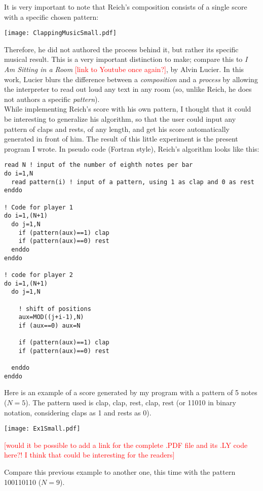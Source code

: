 \documentclass{article}
\begin{document}
It is very important to note that Reich's composition consists of a single score with a specific chosen pattern:

\texttt{[image: ClappingMusicSmall.pdf]}

Therefore, he did not authored the process behind it, but rather its specific musical result. 
This is a very important distinction to make; compare this to \textit{I Am Sitting in a Room}
\textcolor{red}{[link to Youtube once again?]}, by Alvin Lucier. 
In this work, Lucier blurs the difference between a \textit{composition} and a \textit{process} by allowing
the interpreter to read out loud any text in any room (so, unlike Reich, he does not authors a specific
\textit{pattern}). \\

While implementing Reich's score with his own pattern, I thought that it could be interesting to generalize
his algorithm, so that the user could input any pattern of claps and rests, of any length, and get his score
automatically generated in front of him. 
The result of this little experiment is the present program I wrote. 
In pseudo code (Fortran style), Reich's algorithm looks like this:

\begin{verbatim}
read N ! input of the number of eighth notes per bar
do i=1,N
  read pattern(i) ! input of a pattern, using 1 as clap and 0 as rest
enddo

! Code for player 1
do i=1,(N+1)
  do j=1,N
    if (pattern(aux)==1) clap
    if (pattern(aux)==0) rest
  enddo
enddo

! code for player 2
do i=1,(N+1)
  do j=1,N

    ! shift of positions
    aux=MOD((j+i-1),N)
    if (aux==0) aux=N

    if (pattern(aux)==1) clap
    if (pattern(aux)==0) rest

  enddo
enddo
\end{verbatim}

Here is an example of a score generated by my program with a pattern of 5 notes ($N=5$). 
The pattern used is clap, clap, rest, clap, rest (or 11010 in binary notation, considering claps as 1 and rests
as 0).

\texttt{[image: Ex1Small.pdf]}

\textcolor{red}{[would it be possible to add a link for the complete .PDF file and its .LY code here?!
I think that could be interesting for the readers]}

Compare this previous example to another one, this time with the pattern 100110110 ($N=9$).
\end{document}
